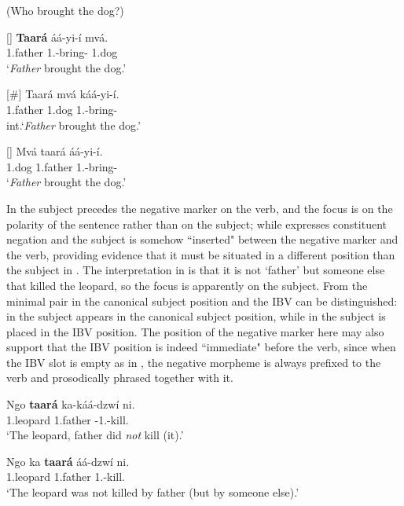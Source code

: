 \documentclass[output=paper,colorlinks,citecolor=brown,
]{langscibook}
\begin{document}
\begin{exe}
     \ex  (Who brought the dog?)\label{73}
    \begin{xlist}
\ex
[]{
\label{73a}
\gll
\textbf{Taará} áá-yi-í mvá.\\
1.father 1\Sm{}.\Pst{}-bring-\Pst{} 1.dog\\
\trans ‘\textit{Father} brought the dog.’
}

\ex
[\#]{
\label{73b}
\gll
Taará mvá káá-yi-í.\\
1.father 1.dog 1\Sm{}.\Pst{}-bring-\Pst{}\\
\trans int.‘\textit{Father} brought the dog.’
}

\ex
[]{
\label{73c}
\gll
Mvá taará áá-yi-í.\\
1.dog 1.father 1\Sm{}.\Pst{}-bring-\Pst{}\\
\trans ‘\textit{Father} brought the dog.’
}

    \end{xlist}
\end{exe}
In  the subject precedes the negative marker on the verb, and the focus is on the polarity of the sentence rather than on the subject; while  expresses constituent negation and the subject is somehow ``inserted" between the negative marker and the verb, providing evidence that it must be situated in a different position than the subject in . The interpretation in  is that it is not `father' but someone else that killed the leopard, so the focus is apparently on the subject. From the minimal pair in  the canonical subject position and the IBV can be distinguished: in  the subject appears in the canonical subject position, while in  the subject is placed in the IBV position. The position of the negative marker here may also support that the IBV position is indeed ``immediate" before the verb, since when the IBV slot is empty as in , the negative morpheme is always prefixed to the verb and prosodically phrased together with it. 
\begin{exe}
     \ex \label{74}
    \begin{xlist}
\ex
\label{74a}
\gll
Ngo \textbf{taará} ka-káá-dzwí ni.\\
1.leopard 1.father \Neg{}-1\Sm{}.\Pst{}-kill.\Pst{} \Neg{}\\
\trans ‘The leopard, father did \textit{not} kill (it).’

\ex
\label{74b}
\gll
Ngo ka \textbf{taará} áá-dzwí ni.\\
1.leopard \Neg{} 1.father 1\Sm{}.\Pst{}-kill.\Pst{} \Neg{}\\
\trans ‘The leopard was not killed by father (but by someone else).’

    \end{xlist}
\end{exe}
\end{document}
